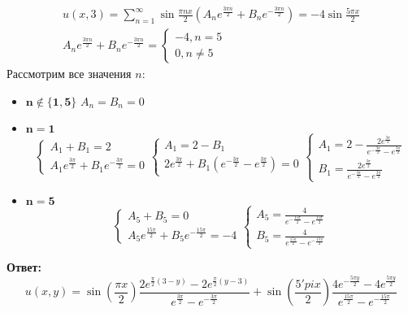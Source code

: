 \documentclass[11pt]{article}
\begin{document}
\begin{sloppypar}
  \begin{equation}
    \begin{gathered}
      u(x, 3) = \sum_{n = 1}^\infty \sin{\frac{\pi n x}{2}} (A_n e^\frac{3\pi n}{2} + B_n e^{- \frac{3\pi n}{2}}) = -4\sin{\frac{5\pi x}{2}}\\
      A_n e^\frac{3\pi n}{2} + B_n e^{- \frac{3\pi n}{2}} = 
        \begin{cases}
          -4, n = 5 \\
          0, n \neq 5
        \end{cases}
    \end{gathered}
  \end{equation}
  Рассмотрим все значения $n$:
  \begin{itemize}
    \item $\mathbf{n \notin \{1, 5\}}$ $A_n = B_n = 0$
    \item $\mathbf{n = 1}$
      \begin{equation}
        \begin{cases}
          A_1 + B_1 = 2 \\
          A_1 e^\frac{3\pi}{2} + B_1 e^{- \frac{3\pi}{2}} = 0
        \end{cases}
        \begin{cases}
          A_1 = 2 - B_1 \\
          2 e^\frac{3\pi}{2} + B_1(e^{- \frac{3\pi}{2}} - e^\frac{3\pi}{2}) = 0
        \end{cases}
        \begin{cases}
          A_1 = 2 - \frac{2 e^\frac{3\pi}{2}}{e^{- \frac{3\pi}{2}} - e^\frac{3\pi}{2}} \\
          B_1 = \frac{2 e^\frac{3\pi}{2}}{e^{- \frac{3\pi}{2}} - e^\frac{3\pi}{2}}
        \end{cases}
      \end{equation}
    \item $\mathbf{n = 5}$
      \begin{equation}
        \begin{cases}
          A_5 + B_5 = 0 \\
          A_5 e^\frac{15\pi}{2} + B_5 e^{- \frac{15\pi}{2}} = -4
        \end{cases}
        \begin{cases}
          A_5 = \frac{4}{e^{- \frac{15\pi}{2}} - e^\frac{15\pi}{2}} \\
          B_5 = \frac{4}{e^\frac{15\pi}{2} - e^{- \frac{15\pi}{2}}}
        \end{cases}
      \end{equation}
  \end{itemize}
  \textbf{Ответ:}
  \begin{equation}
    u(x, y) = \sin{\left(\frac{\pi x}{2}\right)} \frac{2e^{\frac{\pi}{2}(3 - y)} - 2e^{\frac{\pi}{2}(y - 3)}}{e^\frac{3\pi}{2} - e^{- \frac{3\pi}{2}}} + \sin{\left(\frac{5'pi x}{2}\right)} \frac{4e^{- \frac{5\pi y}{2}} - 4e^\frac{5\pi y}{2}}{e^\frac{15 \pi}{2} - e^{- \frac{15 \pi}{2}}}
  \end{equation}
  

\end{sloppypar}
\end{document}
